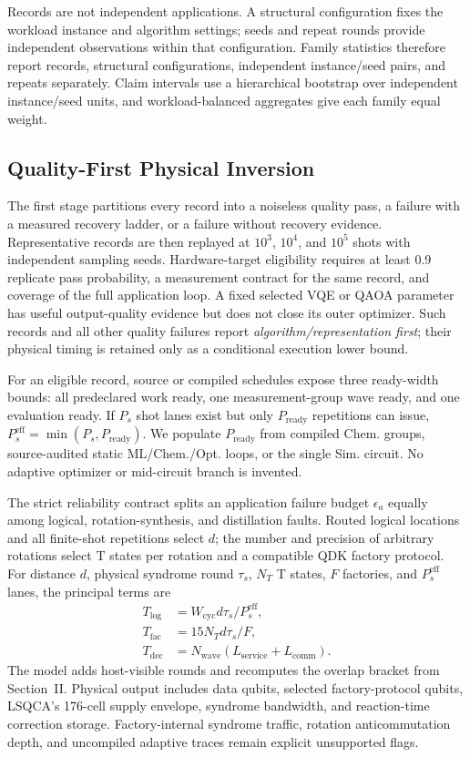 Records are not independent applications. A structural configuration fixes the workload instance and algorithm settings; seeds and repeat rounds provide independent observations within that configuration. Family statistics therefore report records, structural configurations, independent instance/seed pairs, and repeats separately. Claim intervals use a hierarchical bootstrap over independent instance/seed units, and workload-balanced aggregates give each family equal weight.

\subsection{Quality-First Physical Inversion}

The first stage partitions every record into a noiseless quality pass, a failure with a measured recovery ladder, or a failure without recovery evidence. Representative records are then replayed at $10^3$, $10^4$, and $10^5$ shots with independent sampling seeds. Hardware-target eligibility requires at least 0.9 replicate pass probability, a measurement contract for the same record, and coverage of the full application loop. A fixed selected VQE or QAOA parameter has useful output-quality evidence but does not close its outer optimizer. Such records and all other quality failures report \emph{algorithm/representation first}; their physical timing is retained only as a conditional execution lower bound.

For an eligible record, source or compiled schedules expose three ready-width bounds: all predeclared work ready, one measurement-group wave ready, and one evaluation ready. If $P_s$ shot lanes exist but only $P_{\mathrm{ready}}$ repetitions can issue, $P_s^{\mathrm{eff}}=\min(P_s,P_{\mathrm{ready}})$. We populate $P_{\mathrm{ready}}$ from compiled Chem. groups, source-audited static ML/Chem./Opt. loops, or the single Sim. circuit. No adaptive optimizer or mid-circuit branch is invented.

The strict reliability contract splits an application failure budget $\epsilon_a$ equally among logical, rotation-synthesis, and distillation faults. Routed logical locations and all finite-shot repetitions select $d$; the number and precision of arbitrary rotations select T states per rotation and a compatible QDK factory protocol. For distance $d$, physical syndrome round $\tau_s$, $N_T$ T states, $F$ factories, and $P_s^{\mathrm{eff}}$ lanes, the principal terms are
\[
\begin{aligned}
T_{\mathrm{log}} &= W_{\mathrm{cyc}}d\tau_s/P_s^{\mathrm{eff}},\\
T_{\mathrm{fac}} &= 15N_Td\tau_s/F,\\
T_{\mathrm{dec}} &= N_{\mathrm{wave}}(L_{\mathrm{service}}+L_{\mathrm{comm}}).
\end{aligned}
\]
The model adds host-visible rounds and recomputes the overlap bracket from Section~II. Physical output includes data qubits, selected factory-protocol qubits, LSQCA's 176-cell supply envelope, syndrome bandwidth, and reaction-time correction storage. Factory-internal syndrome traffic, rotation anticommutation depth, and uncompiled adaptive traces remain explicit unsupported flags.

